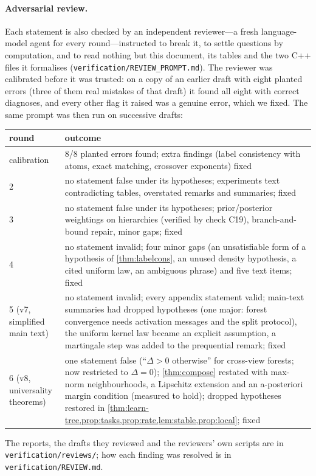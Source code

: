 \documentclass[11pt]{article}
\theoremstyle{definition}
\theoremstyle{remark}
\begin{document}
\paragraph{Adversarial review.}
Each statement is also checked by an independent reviewer---a fresh language-model agent
for every round---instructed to break it, to settle questions by computation, and to
read nothing but this document, its tables and the two C++ files it formalises
(\nolinkurl{verification/REVIEW_PROMPT.md}).  The reviewer was calibrated before it was
trusted: on a copy of an earlier draft with eight planted errors (three of them real
mistakes of that draft) it found all eight with correct diagnoses, and every other flag it
raised was a genuine error, which we fixed.  The same prompt was then run on successive
drafts:

\begin{center}\small
\begin{tabular}{@{}lp{11.5cm}@{}}\toprule
round & outcome\\\midrule
calibration & 8/8 planted errors found; extra findings (label consistency with atoms, exact matching, crossover exponents) fixed\\
2 & no statement false under its hypotheses; experiments text contradicting tables, overstated remarks and summaries; fixed\\
3 & no statement false under its hypotheses; prior/posterior weightings on hierarchies (verified by check C19), branch-and-bound repair, minor gaps; fixed\\
4 & no statement invalid; four minor gaps (an unsatisfiable form of a hypothesis of \cref{thm:labelcons}, an unused density hypothesis, a cited uniform law, an ambiguous phrase) and five text items; fixed\\
5 (v7, simplified main text) & no statement invalid; every appendix statement valid; main-text summaries had dropped hypotheses (one major: forest convergence needs activation messages and the split protocol), the uniform kernel law became an explicit assumption, a martingale step was added to the prequential remark; fixed\\
6 (v8, universality theorems) & one statement false (``$\Delta>0$ otherwise'' for cross-view forests; now restricted to $\Delta=0$); \cref{thm:compose} restated with max-norm neighbourhoods, a Lipschitz extension and an a-posteriori margin condition (measured to hold); dropped hypotheses restored in \cref{thm:learn-tree,prop:tasks,prop:rate,lem:stable,prop:local}; fixed\\
\bottomrule
\end{tabular}
\end{center}

\noindent The reports, the drafts they reviewed and the reviewers' own scripts are in
\texttt{verification/reviews/}; how each finding was resolved is in
\texttt{verification/REVIEW.md}.



\end{document}
